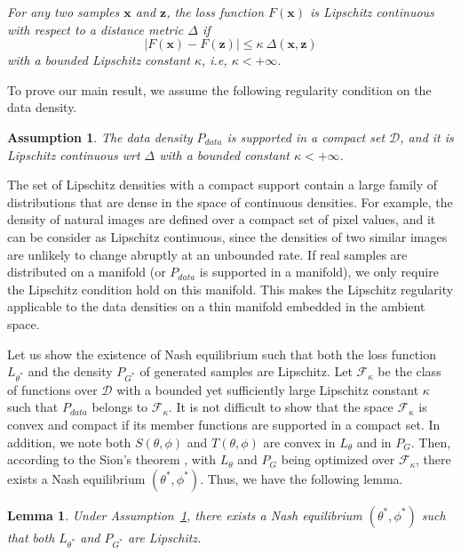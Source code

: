 \documentclass[11pt,fullpage, letterpaper,twoside]{article}
\newtheorem{lemma}{Lemma}
\newtheorem{assumption}{Assumption}
\newcommand{\1}[1]{\mathds{1}_{\left[#1\right]}}
\begin{document}
{ \em For any two samples $\mathbf x$ and $\mathbf z$, the loss function $F(\mathbf x)$ is Lipschitz continuous with respect to a distance metric $\Delta$ if
$$
|F(\mathbf x) - F(\mathbf z)|\leq \kappa ~ \Delta(\mathbf x, \mathbf z)
$$
with a bounded Lipschitz constant $\kappa$, i.e, $\kappa<+\infty$.
}



To prove our main result, we assume the following regularity condition on the data density. \begin{assumption}\label{asp}
The data density $P_{data}$ is supported in a compact set $\mathcal D$, and it is Lipschitz continuous wrt $\Delta$ with a bounded constant $\kappa<+\infty$.
\end{assumption}



The set of Lipschitz densities with a compact support contain a large family of distributions that are dense in the space of continuous densities.
For example, the density of natural images are defined over a compact set of pixel values, and it can be consider as Lipschitz continuous, since the densities of two similar images are unlikely to change abruptly at an unbounded rate. If real samples are distributed on a manifold (or $P_{data}$ is supported in a manifold), we only require the Lipschitz condition hold on this manifold.  This makes the Lipschitz regularity applicable to the data densities on a thin manifold embedded in the ambient space.


Let us show the existence of Nash equilibrium
such that both the loss function $L_{\theta^*}$ and the density $P_{G^*}$ of generated samples are Lipschitz. Let $\mathcal F_\kappa$ be the class of functions over $\mathcal D$ with a bounded yet sufficiently large Lipschitz constant $\kappa$ such that $P_{data}$ belongs to $\mathcal F_\kappa$.
It is not difficult to show that the space $\mathcal F_\kappa$ is convex and compact
if its member functions are supported in a compact set.
In addition, we note both $S(\theta,\phi)$ and $T(\theta,\phi)$ are convex in $L_\theta$ and in $P_G$.
Then, according to the Sion's theorem \cite{sion1958general}, with $L_{\theta}$ and $P_{G}$ being optimized over $\mathcal F_\kappa$, there exists a Nash equilibrium $(\theta^*,\phi^*)$.  Thus, we have the following lemma.





\begin{lemma}\label{lem2}
Under Assumption~\ref{asp}, there exists a Nash equilibrium $(\theta^*,\phi^*)$ such that both $L_{\theta^*}$ and $P_{G^*}$ are Lipschitz.
\end{lemma}
\end{document}
